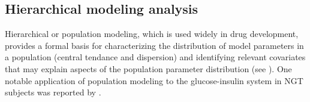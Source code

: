 \documentclass[utf8]{frontiersSCNS} %
\begin{document}
\subsection{Hierarchical modeling analysis}
Hierarchical or population modeling, which is used widely in drug development, provides a formal basis for characterizing the distribution of model parameters in a population (central tendance and dispersion) and identifying relevant covariates that may explain aspects of the population parameter distribution (see \citet{Bonate2011}). One notable application of population modeling to the glucose-insulin system in NGT subjects was reported by \citet{Denti2010}. 
\end{document}
